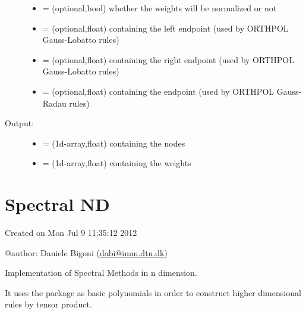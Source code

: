 \documentclass[letterpaper,10pt,english]{sphinxmanual}
\begin{document}
\begin{fulllineitems}
\begin{fulllineitems}
\begin{description}
\begin{itemize}
\item {} 
 = (optional,bool) whether the weights will be normalized or not

\item {} 
 = (optional,float) containing the left endpoint (used by ORTHPOL Gauss-Lobatto rules)

\item {} 
 = (optional,float) containing the right endpoint (used by ORTHPOL Gauss-Lobatto rules)

\item {} 
 = (optional,float) containing the endpoint (used by ORTHPOL Gauss-Radau rules)

\end{itemize}

\item[{Output:}] \leavevmode\begin{itemize}
\item {} 
 = (1d-array,float) containing the nodes

\item {} 
 = (1d-array,float) containing the weights

\end{itemize}

\end{description}

\end{fulllineitems}


\end{fulllineitems}

\label{index:module-SpectralToolbox.SpectralND}

\chapter{Spectral ND}
\label{index:spectral-nd}
Created on Mon Jul  9 11:35:12 2012

@author: Daniele Bigoni (\href{mailto:dabi@imm.dtu.dk}{dabi@imm.dtu.dk})

Implementation of Spectral Methods in n dimension.

It uses the package  as basic polynomials in order to construct higher dimensional rules by tensor product.
\end{document}
